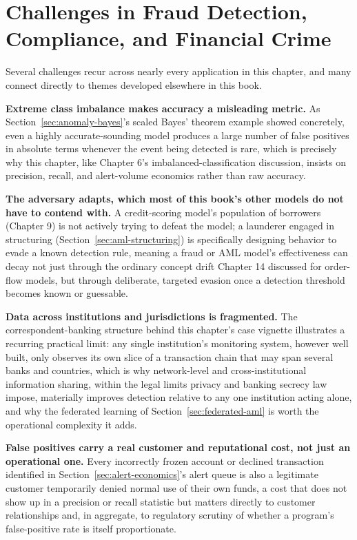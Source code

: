 \documentclass[../ai_in_finance]{subfiles}
\begin{document}
\section{Challenges in Fraud Detection, Compliance, and Financial Crime}

Several challenges recur across nearly every application in this chapter, and many connect directly to themes developed elsewhere in this book.

\textbf{Extreme class imbalance makes accuracy a misleading metric.} As Section~\ref{sec:anomaly-bayes}'s scaled Bayes' theorem example showed concretely, even a highly accurate-sounding model produces a large number of false positives in absolute terms whenever the event being detected is rare, which is precisely why this chapter, like Chapter 6's imbalanced-classification discussion, insists on precision, recall, and alert-volume economics rather than raw accuracy.

\textbf{The adversary adapts, which most of this book's other models do not have to contend with.} A credit-scoring model's population of borrowers (Chapter 9) is not actively trying to defeat the model; a launderer engaged in structuring (Section~\ref{sec:aml-structuring}) is specifically designing behavior to evade a known detection rule, meaning a fraud or AML model's effectiveness can decay not just through the ordinary concept drift Chapter 14 discussed for order-flow models, but through deliberate, targeted evasion once a detection threshold becomes known or guessable.

\textbf{Data across institutions and jurisdictions is fragmented.} The correspondent-banking structure behind this chapter's case vignette illustrates a recurring practical limit: any single institution's monitoring system, however well built, only observes its own slice of a transaction chain that may span several banks and countries, which is why network-level and cross-institutional information sharing, within the legal limits privacy and banking secrecy law impose, materially improves detection relative to any one institution acting alone, and why the federated learning of Section~\ref{sec:federated-aml} is worth the operational complexity it adds.

\textbf{False positives carry a real customer and reputational cost, not just an operational one.} Every incorrectly frozen account or declined transaction identified in Section~\ref{sec:alert-economics}'s alert queue is also a legitimate customer temporarily denied normal use of their own funds, a cost that does not show up in a precision or recall statistic but matters directly to customer relationships and, in aggregate, to regulatory scrutiny of whether a program's false-positive rate is itself proportionate.
\end{document}

